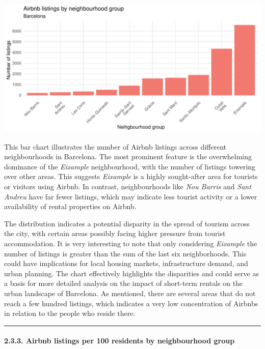 \documentclass[
]{article}
\begin{document}
\begin{center}\includegraphics{Barcelona-AirBnB-Insights_files/figure-latex/plot2-1} \end{center}

This bar chart illustrates the number of Airbnb listings across
different neighbourhoods in Barcelona. The most prominent feature is the
overwhelming dominance of the \emph{Eixample} neighbourhood, with the
number of listings towering over other areas. This suggests
\emph{Eixample} is a highly sought-after area for tourists or visitors
using Airbnb. In contrast, neighbourhoods like \emph{Nou Barris} and
\emph{Sant Andreu} have far fewer listings, which may indicate less
tourist activity or a lower availability of rental properties on Airbnb.

The distribution indicates a potential disparity in the spread of
tourism across the city, with certain areas possibly facing higher
pressure from tourist accommodation. It is very interesting to note that
only considering \emph{Eixample} the number of listings is greater than
the sum of the last six neighborhoods. This could have implications for
local housing markets, infrastructure demand, and urban planning. The
chart effectively highlights the disparities and could serve as a basis
for more detailed analysis on the impact of short-term rentals on the
urban landscape of Barcelona. As mentioned, there are several areas that
do not reach a few hundred listings, which indicates a very low
concentration of Airbnbs in relation to the people who reside there.

\begin{center}\rule{0.5\linewidth}{0.5pt}\end{center}

\hypertarget{airbnb-listings-per-100-residents-by-neighbourhood-group}{%
\paragraph{2.3.3. Airbnb listings per 100 residents by neighbourhood
group}\label{airbnb-listings-per-100-residents-by-neighbourhood-group}}
\end{document}
